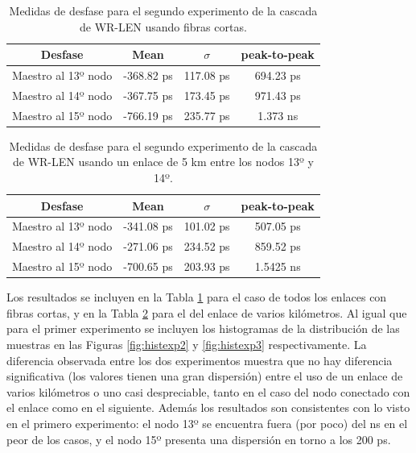 \begin{table}
	\renewcommand{\arraystretch}{1.3}
	\caption{Medidas de desfase para el segundo experimento de la cascada de 
		WR-LEN usando fibras cortas.}
	\label{tab:cascada2}
	\centering
	\begin{tabular}{|c||c||c||c|}
		\hline
		Desfase & Mean & $\sigma$ & peak-to-peak \\
		\hline
		Maestro al 13º nodo & -368.82 ps & 117.08 ps & 694.23 ps \\
		\hline
		Maestro al 14º nodo & -367.75 ps & 173.45 ps & 971.43 ps \\
		\hline
		Maestro al 15º nodo & -766.19 ps & 235.77 ps & 1.373 ns \\
		\hline
	\end{tabular}
\end{table}

\begin{table}
	\renewcommand{\arraystretch}{1.3}
	\caption{Medidas de desfase para el segundo experimento de la cascada de 
		WR-LEN usando un enlace de 5 km entre los nodos 13º y 14º.}
	\label{tab:cascada3}
	\centering
	\begin{tabular}{|c||c||c||c|}
		\hline
		Desfase & Mean & $\sigma$ & peak-to-peak \\
		\hline
		Maestro al 13º nodo & -341.08 ps & 101.02 ps & 507.05 ps \\
		\hline
		Maestro al 14º nodo & -271.06 ps & 234.52 ps & 859.52 ps \\
		\hline
		Maestro al 15º nodo & -700.65 ps & 203.93 ps & 1.5425 ns \\
		\hline
	\end{tabular}
\end{table}

Los resultados se incluyen en la Tabla \ref{tab:cascada2} para el caso de todos 
los enlaces con fibras cortas, y en la Tabla \ref{tab:cascada3} para el del 
enlace de varios kilómetros. Al igual que para el primer experimento se 
incluyen los histogramas de la distribución de las muestras en las Figuras 
\ref{fig:histexp2} y \ref{fig:histexp3} respectivamente. La diferencia 
observada entre los dos experimentos muestra que no hay diferencia 
significativa (los valores tienen una gran dispersión) entre el uso de un 
enlace de varios kilómetros o uno casi despreciable, tanto en el caso del nodo 
conectado con el enlace como en el siguiente. Además los resultados son 
consistentes con lo visto en el primero experimento: el nodo 13º se encuentra 
fuera (por poco) del ns en el peor de los casos, y el nodo 15º presenta una 
dispersión en torno a los 200 ps.

